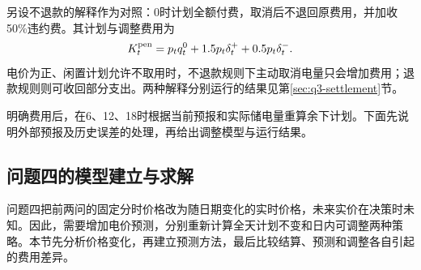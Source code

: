 另设不退款的解释作为对照：0时计划全额付费，取消后不退回原费用，并加收50\%违约费。其计划与调整费用为
\begin{equation}
  K_t^{\rm pen}=p_tq_t^0+1.5p_t\delta_t^++0.5p_t\delta_t^-.
  \label{eq:penalty-cost}
\end{equation}
电价为正、闲置计划允许不取用时，不退款规则下主动取消电量只会增加费用；退款规则则可收回部分支出。两种解释分别运行的结果见第\ref{sec:q3-settlement}节。

明确费用后，在6、12、18时根据当前预报和实际储电量重算余下计划。下面先说明外部预报及历史误差的处理，再给出调整模型与运行结果。



\subsection{问题四的模型建立与求解}
\label{sec:problem4}

问题四把前两问的固定分时价格改为随日期变化的实时价格，未来实价在决策时未知。因此，需要增加电价预测，分别重新计算全天计划不变和日内可调整两种策略。本节先分析价格变化，再建立预测方法，最后比较结算、预测和调整各自引起的费用差异。


